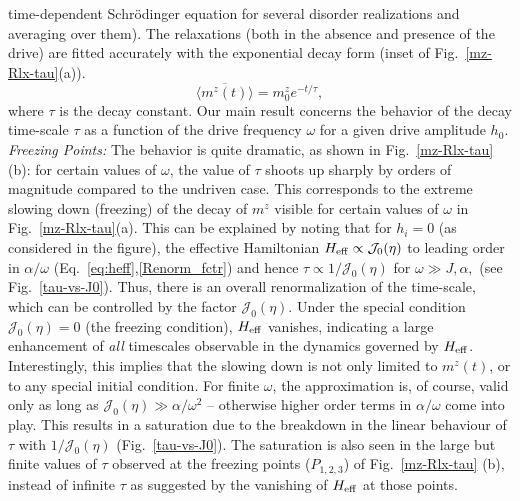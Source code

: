 \documentclass[reprint,preprintnumbers,showpacs,amsmath,twocolumn,showkeys,aps,prl]{revtex4-1}
\begin{document}
time-dependent Schr\"{o}dinger equation for several disorder realizations and averaging 
over them). The relaxations (both in the absence and presence of the drive) 
are fitted accurately with the exponential decay form 
(inset of Fig.~\ref{mz-Rlx-tau}(a)).
\begin{equation}
\overline{\langle m^{z}(t)\rangle} =  m^{z}_{0}e^{-t/\tau},
\label{Exp-decay-fit}
\end{equation} 
\noindent
where $\tau$ is the decay constant. Our main result concerns the behavior of the decay time-scale $\tau$ 
as a function of the drive frequency $\omega$ for a given drive amplitude $h_{0}$. \\

\noindent
{\it Freezing Points:}
The behavior is quite dramatic, as shown in Fig.~\ref{mz-Rlx-tau}(b):
for certain values of $\omega$, the value of $\tau$ shoots up sharply 
by orders of magnitude compared to the undriven case. This corresponds 
to the extreme slowing down (freezing) of the decay of $m^z$ visible for certain 
values of $\omega$ in Fig.~\ref{mz-Rlx-tau}(a).
This can be explained by noting that for $h_{i}=0$ (as considered in the figure), 
the effective Hamiltonian  $H_{\rm eff} \propto {\mathcal J}_{0}(\eta)$ to leading order in $\alpha/\omega$ 
(Eq.~\ref{eq:heff},\ref{Renorm_fctr}) and hence $\tau \propto 1/{\mathcal J}_{0}(\eta)$ for $\omega \gg J,\alpha,$ (see Fig.~\ref{tau-vs-J0}). Thus, there is an overall renormalization of the time-scale, which can be controlled
by the factor ${\mathcal J}_{0}(\eta).$ Under the special condition ${\mathcal J}_{0}(\eta)=0$ (the freezing condition), $H_{\rm eff}$ 
vanishes, indicating a large enhancement of {\it all} timescales observable in the dynamics governed by $H_{\rm eff}$.
Interestingly, this implies that the slowing down is not only limited to $m^z(t)$, 
or to any special initial condition. 
For finite $\omega$, the approximation is, of course, valid only as long as 
${\mathcal J}_{0}(\eta) \gg \alpha/\omega^{2}$ -- otherwise higher order terms in $\alpha/\omega$ 
come into play. This results in a saturation due to the breakdown in the linear behaviour of $\tau$ with $1/{\mathcal J}_{0}(\eta)$ (Fig.~\ref{tau-vs-J0}). The saturation is also seen in the large but finite values of $\tau$ observed
at the freezing points ($P_{1,2,3}$) of Fig.~\ref{mz-Rlx-tau} (b), instead of infinite $\tau$ as suggested by 
the vanishing of $H_{\rm eff}$ at those points.    \\
\end{document}
